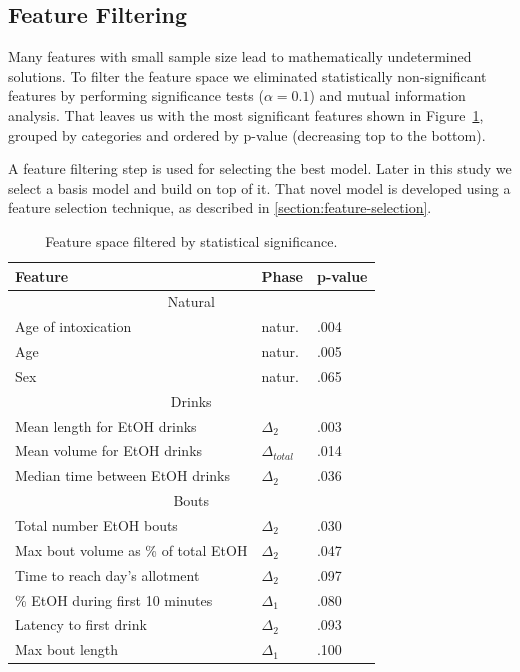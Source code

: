 	\subsection{Feature Filtering}
	Many features with small sample size lead to mathematically undetermined solutions. To filter the feature space we eliminated statistically non-significant features by performing significance tests ($\alpha=0.1$) and mutual information analysis. That leaves us with the most significant features shown in Figure~\ref{tab:feat-most-signif}, grouped by categories and ordered by p-value (decreasing top to the bottom). 
	
	A feature filtering step is used for selecting the best model. Later in this study we select a basis model and build on top of it. That novel model is developed using a feature selection technique, as described in \cref{section:feature-selection}.
	
	\begin{table}[h]
		\centering
		\caption{Feature space filtered by statistical significance.}
		\label{tab:feat-most-signif}
		\begin{tabular}{lll}
			\hline
			\abovespace\belowspace
			Feature & Phase & p-value\\
			\hline
			\multicolumn{3}{c}{Natural}\\
			\hline
			Age of intoxication & natur. & .004\\
			Age & natur. & .005\\
			Sex & natur. & .065\\
			\hline
			\multicolumn{3}{c}{Drinks}\\
			\hline
			Mean length for EtOH drinks & $\Delta_2$ & .003\\
			Mean volume for EtOH drinks & $\Delta_{total}$ & .014\\
			Median time between EtOH drinks & $\Delta_{2}$ & .036\\
			\hline
			\multicolumn{3}{c}{Bouts}\\
			\hline
			Total number EtOH bouts & $\Delta_{2}$ & .030\\
			Max bout volume as \% of total EtOH & $\Delta_{2}$ & .047\\
			Time to reach day's allotment & $\Delta_{2}$ & .097\\	
			\% EtOH during first 10 minutes & $\Delta_{1}$ & .080\\	
			Latency to first drink & $\Delta_{2}$ & .093\\
			Max bout length & $\Delta_{1}$ & .100\\			
			\hline
		\end{tabular}
	\end{table}


